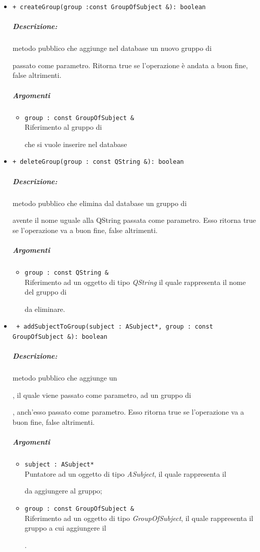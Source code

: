 \begin{itemize}
			\item  \color{blue}\verb!+ createGroup(group :const GroupOfSubject &): boolean!
			\color{black}
			\subparagraph{Descrizione:} metodo pubblico che aggiunge nel database un nuovo gruppo di \subject{} passato come parametro. Ritorna true se l'operazione è andata a buon fine, false altrimenti.
			\subparagraph{Argomenti}
			\begin{itemize}
				\item\color{RoyalPurple} \verb!group : const GroupOfSubject &! \\ 
				\color{black}Riferimento al gruppo di \subject{} che si vuole inserire nel database
			\end{itemize}

			\item  \color{blue}\verb!+ deleteGroup(group : const QString &): boolean!\\
			\color{black}
			\subparagraph{Descrizione:} metodo pubblico che elimina dal database un gruppo di \subject{} avente il nome uguale alla QString passata come parametro. Esso ritorna true se l'operazione va a buon fine, false altrimenti.
			\subparagraph{Argomenti}
			\begin{itemize}
				\item \verb!group : const QString &! \\ Riferimento ad un oggetto di tipo \textsl{QString} il quale rappresenta il nome del gruppo di \subject{} da eliminare.
			\end{itemize}
			
			\item \color{blue}\verb! + addSubjectToGroup(subject : ASubject*, group : const GroupOfSubject &): boolean!
			\color{black} 
			\subparagraph{Descrizione:} metodo pubblico che aggiunge un \subject{}, il quale viene passato come parametro, ad un gruppo di \subject{}, anch'esso passato come parametro. Esso ritorna true se l'operazione va a buon fine, false altrimenti.
			\subparagraph{Argomenti}
			\begin{itemize}
				\item \color{RoyalPurple}\verb!subject : ASubject*! \\ 
				\color{black}Puntatore ad un oggetto di tipo \textsl{ASubject}, il quale rappresenta il \subject{} da aggiungere al gruppo;
				
				\item \color{RoyalPurple}\verb!group : const GroupOfSubject &! \\ 
				\color{black}Riferimento ad un oggetto di tipo \textsl{GroupOfSubject}, il quale rappresenta il gruppo a cui aggiungere il \subject{}.
			\end{itemize}


\end{itemize}
